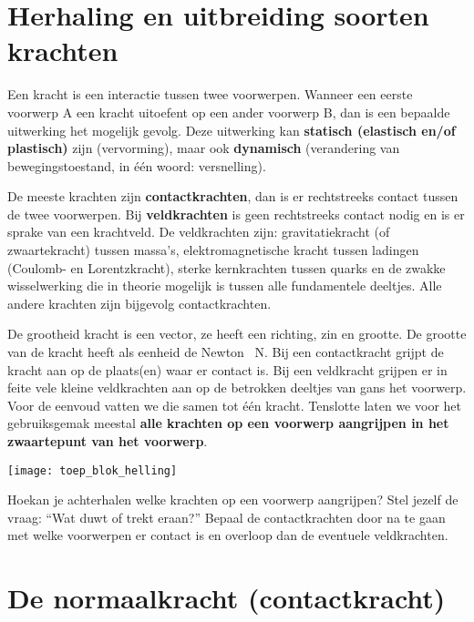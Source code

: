 \documentclass{ximera}
\begin{document}
	\author{Bart Lambregs}
    \xmsource\xmuitleg



\section*{Herhaling en uitbreiding soorten krachten}

Een kracht is een interactie tussen twee voorwerpen. 
Wanneer een eerste voorwerp A een kracht uitoefent op een ander voorwerp B, dan is een bepaalde uitwerking het mogelijk gevolg. 
Deze uitwerking kan \textbf{statisch (elastisch en/of plastisch)} zijn (vervorming), maar ook \textbf{dynamisch} (verandering van bewegingstoestand, in één woord: versnelling).

De meeste krachten zijn \textbf{contactkrachten}, dan is er rechtstreeks contact tussen de twee voorwerpen. 
Bij \textbf{veldkrachten} is geen rechtstreeks contact nodig en is er sprake van een krachtveld. 
De veldkrachten zijn: gravitatiekracht (of zwaartekracht) tussen massa's, elektromagnetische kracht tussen ladingen (Coulomb- en Lorentzkracht), sterke kernkrachten tussen quarks en de zwakke wisselwerking die in theorie mogelijk is tussen alle fundamentele deeltjes. 
Alle andere krachten zijn bijgevolg contactkrachten.

De grootheid kracht is een vector, ze heeft een richting, zin en grootte. 
De grootte van de kracht heeft als eenheid de Newton \SI{}{\newton}. 
Bij een contactkracht grijpt de kracht aan op de plaats(en) waar er contact is. 
Bij een veldkracht grijpen er in feite vele kleine veldkrachten aan op de betrokken deeltjes van gans het voorwerp. 
Voor de eenvoud vatten we die samen tot één kracht. 
Tenslotte laten we voor het gebruiksgemak meestal \textbf{alle krachten op een voorwerp aangrijpen in het zwaartepunt van het voorwerp}.


\begin{image}[0.5\textwidth]
  \texttt{[image: toep\_blok\_helling]}
\end{image}

Hoekan je achterhalen welke krachten op een voorwerp aangrijpen? 
Stel jezelf de vraag: ``Wat duwt of trekt eraan?'' 
Bepaal de contactkrachten door na te gaan met welke voorwerpen er contact is en overloop dan de eventuele veldkrachten.

\section*{De normaalkracht (contactkracht)}
\end{document}
